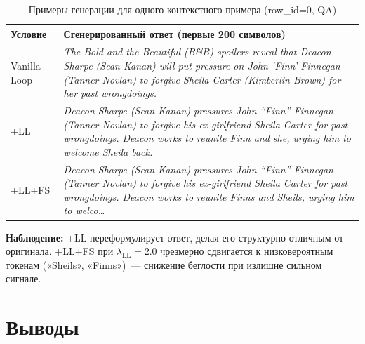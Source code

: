 \documentclass[a4paper,12pt]{extarticle}
\newcommand{\LL}{\mathrm{LL}}
\begin{document}
\begin{table}[H]
\centering
\caption{Примеры генерации для одного контекстного примера (row\_id=0, QA)}
\label{tab:examples}
\small
\begin{tabular}{p{2.0cm}p{11cm}}
\toprule
\textbf{Условие} & \textbf{Сгенерированный ответ (первые 200 символов)} \\
\midrule
Vanilla Loop &
  \textit{The Bold and the Beautiful (B\&B) spoilers reveal that Deacon Sharpe (Sean Kanan)
  will put pressure on John `Finn' Finnegan (Tanner Novlan) to forgive Sheila Carter
  (Kimberlin Brown) for her past wrongdoings.} \\[0.5em]
+LL &
  \textit{Deacon Sharpe (Sean Kanan) pressures John ``Finn'' Finnegan (Tanner Novlan)
  to forgive his ex-girlfriend Sheila Carter for past wrongdoings. Deacon works to reunite
  Finn and she, urging him to welcome Sheila back.} \\[0.5em]
+LL+FS &
  \textit{Deacon Sharpe (Sean Kanan) pressures John ``Finn'' Finnegan (Tanner Novlan)
  to forgive his ex-girlfriend Sheila Carter for past wrongdoings. Deacon works to reunite
  Finns and Sheils, urging him to welco{\ldots}} \\
\bottomrule
\end{tabular}
\end{table}

\textbf{Наблюдение:} +LL переформулирует ответ, делая его структурно отличным от
оригинала. +LL+FS при $\lambda_\LL = 2.0$ чрезмерно сдвигается к
низковероятным токенам («Sheils», «Finns»)~--- снижение беглости при
излишне сильном сигнале.

\section{Выводы}
\label{sec:conclusion}
\end{document}
